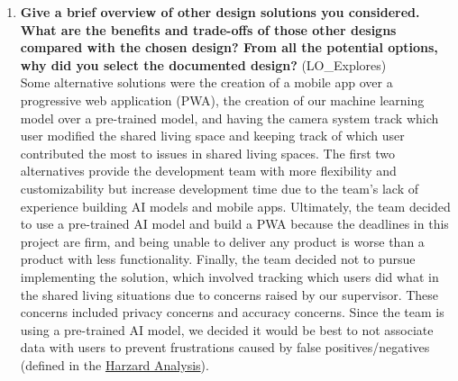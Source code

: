 \documentclass[12pt, titlepage]{article}
\begin{document}
\begin{enumerate}
  \item \textbf{Give a brief overview of other design solutions you considered.  What
  are the benefits and trade-offs of those other designs compared with the chosen
  design?  From all the potential options, why did you select the documented design?}
  (LO\_Explores)\\
  Some alternative solutions were the creation of a mobile app over a progressive web application (PWA), the creation of our machine learning model over a pre-trained model, and having the camera system track which user modified the shared living space and keeping track of which user contributed the most to issues in shared living spaces. The first two alternatives provide the development team with more flexibility and customizability but increase development time due to the team's lack of experience building AI models and mobile apps. Ultimately, the team decided to use a pre-trained AI model and build a PWA because the deadlines in this project are firm, and being unable to deliver any product is worse than a product with less functionality. Finally, the team decided not to pursue implementing the solution, which involved tracking which users did what in the shared living situations due to concerns raised by our supervisor. These concerns included privacy concerns and accuracy concerns. Since the team is using a pre-trained AI model, we decided it would be best to not associate data with users to prevent frustrations caused by false positives/negatives (defined in the \href{https://github.com/jinalkast/room8/tree/main/docs/HazardAnalysis}{Harzard Analysis}).
\end{enumerate}
\end{document}
